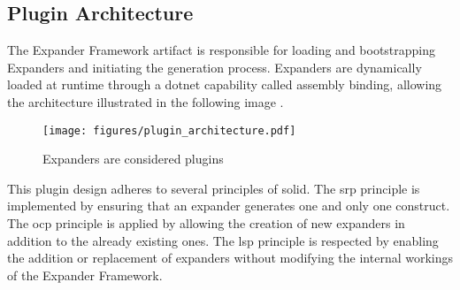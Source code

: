 \subsection{Plugin Architecture} \label{subsec_plugin_architecture}

The Expander Framework artifact is responsible for loading and bootstrapping Expanders and
initiating the generation process. Expanders are dynamically loaded at runtime through a
dotnet capability called assembly binding, allowing the architecture illustrated in the
following image \parencite{koks_expanderpluginloaderinteractor_2023}.

\begin{figure}[htbp]
  \centering
  \texttt{[image: figures/plugin\_architecture.pdf]}
  \caption[Plugin Archticture]{Expanders are considered plugins}
  \label{fi:plugin_architecture}
\end{figure}

This plugin design adheres to several principles of \gls{solid}. The \gls{srp} principle
is implemented by ensuring that an expander generates one and only one construct. The
\gls{ocp} principle is applied by allowing the creation of new expanders in addition to
the already existing ones. The \gls{lsp} principle is respected by enabling the addition
or replacement of expanders without modifying the internal workings of the Expander
Framework.